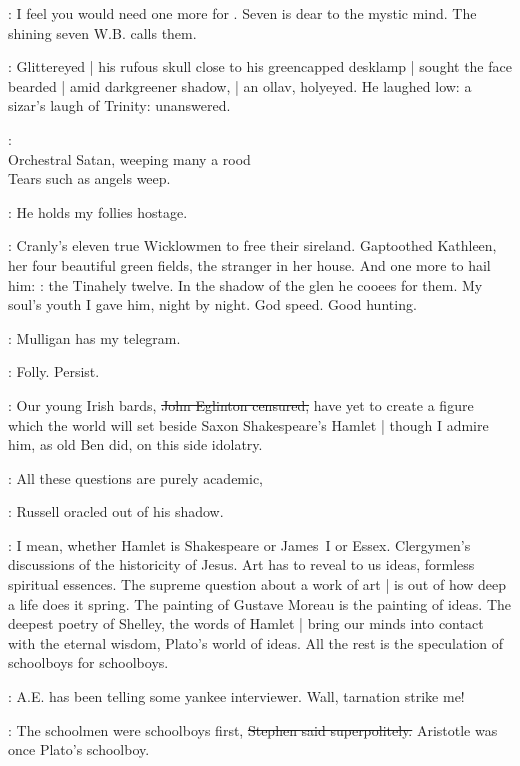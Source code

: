 \eglinton:
I feel you would need one more for .
Seven is dear to the mystic mind.
The shining seven W.B. calls them.

:
Glittereyed |
his rufous skull close to his greencapped desklamp |
sought the face bearded |
amid darkgreener shadow, |
an ollav, holyeyed.
He laughed low: a sizar's laugh of Trinity: unanswered.

\StephenInt: \\
    Orchestral Satan, weeping many a rood \\
    Tears such as angels weep. \\

\StephenInt:
He holds my follies hostage.

\StephenInt:
Cranly's eleven true Wicklowmen to free their sireland.
Gaptoothed Kathleen,
her four beautiful green fields,
the stranger in her house.
And one more to hail him:
:
the Tinahely twelve.
In the shadow of the glen
he cooees for them.
My soul's youth I gave him, night by night.
God speed.
Good hunting.%

\StephenInt:
Mulligan has my telegram.

\StephenInt:
Folly. Persist.

\eglinton:
Our young Irish bards,
\sout{John Eglinton censured,}
have yet to create a figure
which the world will set beside Saxon Shakespeare's Hamlet |
though I admire him,
as old Ben did,
on this side idolatry.

\AErussell:
All these questions are purely academic,

:
Russell oracled out of his shadow.

\AErussell:
I mean, whether Hamlet is Shakespeare or James~I or Essex.
Clergymen's discussions of the historicity of Jesus.
Art has to reveal to us ideas,
formless spiritual essences.
The supreme question about a work of art |
is out of how deep a life does it spring.
The painting of Gustave Moreau is the painting of ideas.
The deepest poetry of Shelley,
the words of Hamlet |
bring our minds into contact with the eternal wisdom,
Plato's world of ideas.
All the rest is the speculation of schoolboys for schoolboys.

\StephenInt:
A.E. has been telling some yankee interviewer.
Wall, tarnation strike me!

\Stephen:
The schoolmen were schoolboys first,
\sout{Stephen said superpolitely.}
Aristotle was once Plato's schoolboy.

